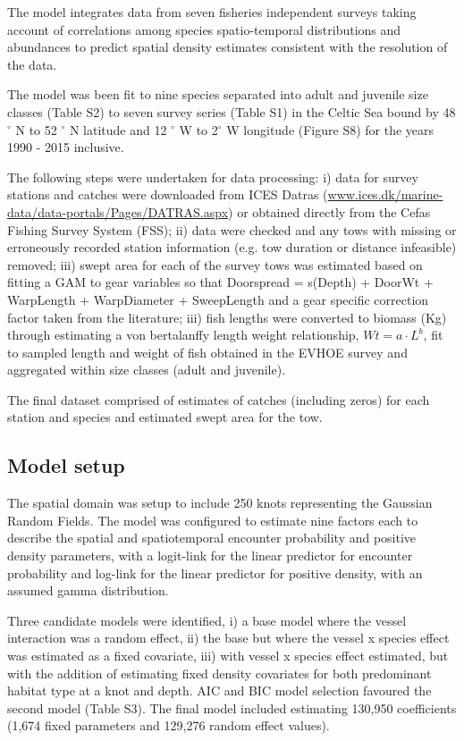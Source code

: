\documentclass{nature}
\begin{document}
\begin{linenumbers}
The model integrates data from seven fisheries independent surveys taking
account of correlations among species spatio-temporal distributions and
abundances to predict spatial density estimates consistent with the resolution
of the data. 

The model was been fit to nine species separated into adult and juvenile size
classes (Table S2) to seven survey series (Table S1) in the Celtic Sea bound by
48$^{\circ}$ N to 52 $^{\circ}$ N latitude and 12 $^{\circ}$ W to 2$^{\circ}$ W
longitude (Figure S8) for the years 1990 - 2015 inclusive. 

The following steps were undertaken for data processing: i) data for survey
stations and catches were downloaded from ICES Datras
(\url{www.ices.dk/marine-data/data-portals/Pages/DATRAS.aspx}) or obtained
directly from the Cefas Fishing Survey System (FSS); ii) data were checked and
any tows with missing or erroneously recorded station information (e.g. tow
duration or distance infeasible) removed; iii) swept area for each of the
survey tows was estimated based on fitting a GAM to gear variables so that
Doorspread = s(Depth) + DoorWt + WarpLength + WarpDiameter + SweepLength and a
gear specific correction factor taken from the literature\cite{Piet2009}; iii)
fish lengths were converted to biomass (Kg) through estimating a von
bertalanffy length weight relationship, $Wt = a \cdot L^{b}$, fit to sampled
length and weight of fish obtained in the EVHOE survey and aggregated within
size classes (adult and juvenile). 

The final dataset comprised of estimates of catches (including zeros) for each
station and species and estimated swept area for the tow.

\subsection{Model setup}

The spatial domain was setup to include 250 knots representing the Gaussian
Random Fields. The model was configured to estimate nine factors each to describe
the spatial and spatiotemporal encounter probability and positive density
parameters, with a logit-link for the linear predictor for encounter
probability and log-link for the linear predictor for positive density, with an
assumed gamma distribution.

Three candidate models were identified, i) a base model where the vessel
interaction was a random effect, ii) the base but where the vessel x species
effect was estimated as a fixed covariate, iii) with vessel x species effect
estimated, but with the addition of estimating fixed density covariates for
both predominant habitat type at a knot and depth. AIC and BIC model selection
favoured the second model (Table S3). The final model included estimating
130,950 coefficients (1,674 fixed parameters and 129,276 random effect values).


\end{linenumbers}
\end{document}
